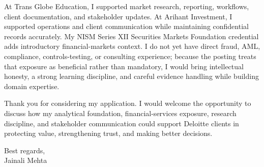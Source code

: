 \documentclass[letterpaper,11pt]{article}
\begin{document}
\bigbreak
At Trans Globe Education, I supported market research, reporting, workflows, client documentation, and stakeholder updates. At Arihant Investment, I supported operations and client communication while maintaining confidential records accurately. My NISM Series XII Securities Markets Foundation credential adds introductory financial-markets context. I do not yet have direct fraud, AML, compliance, controls-testing, or consulting experience; because the posting treats that exposure as beneficial rather than mandatory, I would bring intellectual honesty, a strong learning discipline, and careful evidence handling while building domain expertise.

\bigbreak
Thank you for considering my application. I would welcome the opportunity to discuss how my analytical foundation, financial-services exposure, research discipline, and stakeholder communication could support Deloitte clients in protecting value, strengthening trust, and making better decisions.

\bigbreak
Best regards,\\
Jainali Mehta
\end{document}
